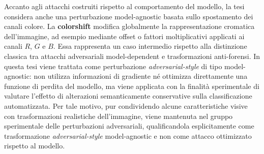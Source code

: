 Accanto agli attacchi costruiti rispetto al comportamento del modello, la tesi
considera anche una perturbazione model-agnostic basata sullo spostamento dei
canali colore. La \textbf{\gls{colorshift}} modifica globalmente la rappresentazione
cromatica dell'immagine, ad esempio mediante offset o fattori moltiplicativi
applicati ai canali \(R\), \(G\) e \(B\). Essa rappresenta un caso intermedio
rispetto alla distinzione classica tra attacchi adversariali model-dependent e
trasformazioni anti-forensi. In questa tesi viene trattata come perturbazione
\textit{adversarial-style} di tipo model-agnostic: non utilizza informazioni di
gradiente né ottimizza direttamente una funzione di perdita del modello, ma viene
applicata con la finalità sperimentale di valutare l'effetto di alterazioni
semanticamente conservative sulla classificazione automatizzata. Per tale motivo,
pur condividendo alcune caratteristiche visive con trasformazioni realistiche
dell'immagine, viene mantenuta nel gruppo sperimentale delle perturbazioni
adversariali, qualificandola esplicitamente come trasformazione
\textit{adversarial-style} model-agnostic e non come attacco ottimizzato rispetto
al modello.

